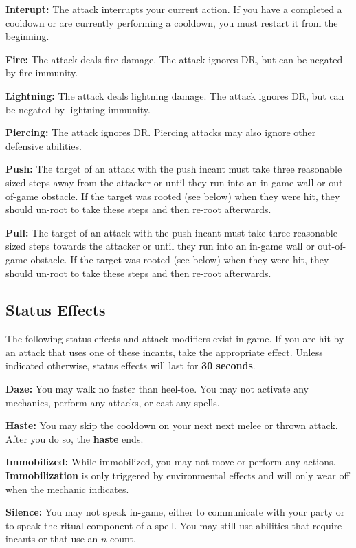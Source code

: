 \documentclass[green]{grimrock}
\begin{document}
{\bf Interupt:} The attack interrupts your current action.  If you have a completed a cooldown or are currently performing a cooldown, you must restart it from the beginning.

{\bf Fire:} The attack deals fire damage.  The attack ignores DR, but can be negated by fire immunity.

{\bf Lightning:} The attack deals lightning damage.  The attack ignores DR, but can be negated by lightning immunity.

{\bf Piercing:} The attack ignores DR.  Piercing attacks may also ignore other defensive abilities.

{\bf Push:} The target of an attack with the push incant must take three reasonable sized steps away from the attacker or until they run into an in-game wall or out-of-game obstacle. If the target was rooted (see below) when they were hit, they should un-root to take these steps and then re-root afterwards.

{\bf Pull:} The target of an attack with the push incant must take three reasonable sized steps towards the attacker or until they run into an in-game wall or out-of-game obstacle. If the target was rooted (see below) when they were hit, they should un-root to take these steps and then re-root afterwards.


\subsection{Status Effects}

The following status effects and attack modifiers exist in game.  If you are hit by an attack that uses one of these incants, take the appropriate effect.  Unless indicated otherwise, status effects will last for {\bf 30 seconds}.

{\bf Daze:} You may walk no faster than heel-toe.  You may not activate any mechanics, perform any attacks, or cast any spells.


{\bf Haste:} You may skip the cooldown on your next next melee or thrown attack.  After you do so, the {\bf haste} ends.

{\bf Immobilized:}  While immobilized, you may not move or perform any actions.  {\bf Immobilization} is only triggered by environmental effects and will only wear off when the mechanic indicates.

{\bf Silence:} You may not speak in-game, either to communicate with your party or to speak the ritual component of a spell.  You may still use abilities that require incants or that use an $n$-count.
\end{document}
